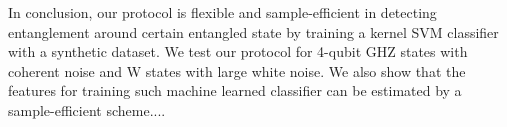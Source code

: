 \documentclass[
aps,
pra,
twocolumn,
floatfix,
]{revtex4-2}
\theoremstyle{plain}
\theoremstyle{definition}
\newcommand{\pob}{O}
\newcommand{\dm}{\rho}
\begin{document}
In conclusion,
our protocol is flexible and sample-efficient in detecting entanglement around certain entangled state by training a kernel SVM classifier with a synthetic dataset.
We test our protocol for 4-qubit GHZ states with coherent noise and W states with large white noise.
We also show that the features for training such machine learned classifier can be estimated by a sample-efficient scheme....
\end{document}
